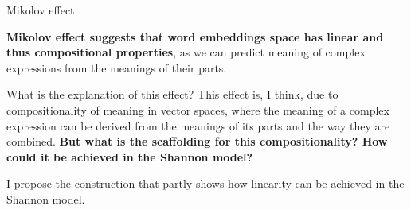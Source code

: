 \documentclass[10pt, aspectratio=169, handout]{beamer}
\begin{document}
\begin{frame}{Mikolov effect}

   
       
   \textbf{ Mikolov effect suggests that word embeddings space has linear and thus compositional properties}, as we can predict meaning of complex expressions from the meanings of their parts.
  

    What is the explanation of this effect?
    This effect is, I think,  due to  compositionality of meaning in vector spaces, where the meaning of a complex expression can be derived from the meanings of its parts and the way they are combined.
\textbf{
    But what is the scaffolding for this compositionality? How could it be achieved in the Shannon model? }
    
    I propose the construction that partly shows how linearity can be achieved in the Shannon model.

\end{frame}
\end{document}
